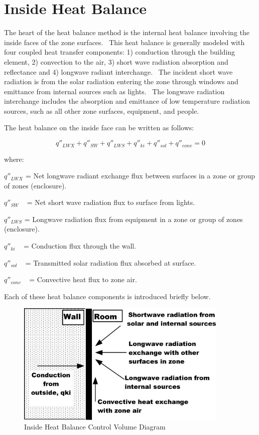 \section{Inside Heat Balance}\label{inside-heat-balance}

The heart of the heat balance method is the internal heat balance involving the inside faces of the zone surfaces.~ This heat balance is generally modeled with four coupled heat transfer components: 1) conduction through the building element, 2) convection to the air, 3) short wave radiation absorption and reflectance and 4) longwave radiant interchange.~ The incident short wave radiation is from the solar radiation entering the zone through windows and emittance from internal sources such as lights.~ The longwave radiation interchange includes the absorption and emittance of low temperature radiation sources, such as all other zone surfaces, equipment, and people.

The heat balance on the inside face can be written as follows:

\begin{equation}
{q''_{LWX}} + {q''_{SW}} + {q''_{LWS}} + {q''_{ki}} + {q''_{sol}} + {q''_{conv}} = 0
\label{eq:InsideFaceHeatBalanceEquation}
\end{equation}

where:

\({q''_{LWX}}\) = Net longwave radiant exchange flux between surfaces in a zone or group of zones (enclosure).

\({q''_{SW}}\) ~ = Net short wave radiation flux to surface from lights.

\({q''_{LWS}}\) = Longwave radiation flux from equipment in a zone or group of zones (enclosure).

\({q''_{ki}}\) ~ = Conduction flux through the wall.

\({q''_{sol}}\) ~ = Transmitted solar radiation flux absorbed at surface.

\({q''_{conv}}\) ~ = Convective heat flux to zone air.

Each of these heat balance components is introduced briefly below.

\begin{figure}[hbtp] %
\centering
\includegraphics[width=0.9\textwidth, height=0.9\textheight, keepaspectratio=true]{media/image301.png}
\caption{Inside Heat Balance Control Volume Diagram \protect \label{fig:inside-heat-balance-control-volume-diagram}}
\end{figure}


